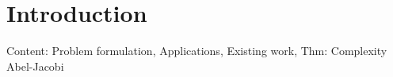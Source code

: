 \documentclass[main.tex]{subfiles}
\begin{document}
  \section{Introduction}

  Content: Problem formulation, Applications, Existing work, Thm: Complexity Abel-Jacobi
  
\end{document}
